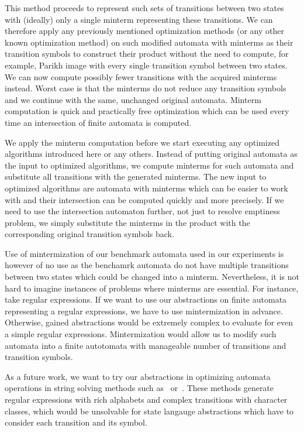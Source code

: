 This method proceeds to represent such sets of transitions between two states with (ideally) only a single minterm representing these transitions. We can therefore apply any previously mentioned optimization methods (or any other known optimization method) on such modified automata with minterms as their transition symbols to construct their product without the need to compute, for example, Parikh image with every single transition symbol between two states. We can now compute possibly fewer transitions with the acquired minterms instead. Worst case is that the minterms do not reduce any transition symbols and we continue with the same, unchanged original automata. Minterm computation is quick and practically free optimization which can be used every time an intersection of finite automata is computed.

We apply the minterm computation before we start executing any optimized algorithms introduced here or any others. Instead of putting original automata as the input to optimized algorithms, we compute minterms for such automata and substitute all transitions with the generated minterms. The new input to optimized algorithms are automata with minterms which can be easier to work with and their intersection can be computed quickly and more precisely. If we need to use the intersection automaton further, not just to resolve emptiness problem, we simply substitute the minterms in the product with the corresponding original transition symbols back.

Use of mintermization of our benchmark automata used in our experiments is however of no use as the benchamrk automata do not have multiple transitions between two states which could be changed into a minterm. Nevertheless, it is not hard to imagine instances of problems where minterms are essential. For instance, take regular expressions. If we want to use our abstractions on finite automata representing a regular expressions, we have to use mintermization in advance. Otherwise, gained abstractions would be extremely complex to evaluate for even a simple regular expressions. Mintermization would allow us to modify such automata into a finite autotomata with manageable number of transitions and transition symbols.

As a future work, we want to try our abstractions in optimizing automata operations in string solving methods such as~\cite{10.1007/978-3-319-08867-9_10} or~\cite{DBLP:conf/popl/LinB17}. These methods generate regular expressions with rich alphabets and complex transitions with character classes, which would be unsolvable for state langauge abstractions which have to consider each transition and its symbol.


